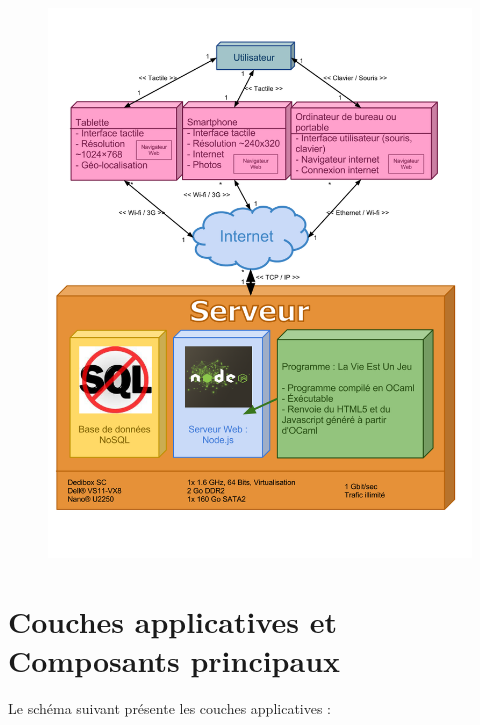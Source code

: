 \documentclass{life-fr}
\begin{document}
\begin{figure}[H]
  \begin{center}
    \includegraphics[width=17cm]{img/deploiement.png}
  \end{center}
\end{figure}



\chapter{Couches applicatives et Composants principaux}

Le schéma suivant présente les couches applicatives :
\end{document}
